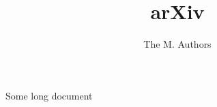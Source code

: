 \documentclass[11pt]{book}
\title{arXiv}
\author{The M. Authors}
\begin{document}
\maketitle

Some long document


\end{document}
